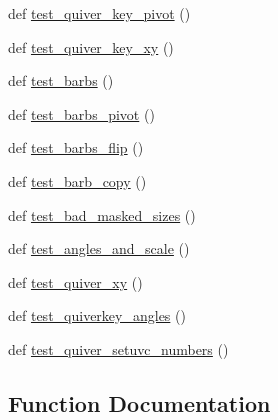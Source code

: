 \begin{DoxyCompactItemize}
\item 
def \hyperlink{namespacematplotlib_1_1tests_1_1test__quiver_a35cedc8f52b998cab732ffa707091ebb}{test\+\_\+quiver\+\_\+key\+\_\+pivot} ()
\item 
def \hyperlink{namespacematplotlib_1_1tests_1_1test__quiver_a6ef4a937ed2eefed3aab9983388fcafb}{test\+\_\+quiver\+\_\+key\+\_\+xy} ()
\item 
def \hyperlink{namespacematplotlib_1_1tests_1_1test__quiver_ac73571296fdfed6be8fbf589c1cf3985}{test\+\_\+barbs} ()
\item 
def \hyperlink{namespacematplotlib_1_1tests_1_1test__quiver_a16325962922cc6ab0040cfa9c488bc24}{test\+\_\+barbs\+\_\+pivot} ()
\item 
def \hyperlink{namespacematplotlib_1_1tests_1_1test__quiver_ae0d91521d7f5774c781232cc569a5295}{test\+\_\+barbs\+\_\+flip} ()
\item 
def \hyperlink{namespacematplotlib_1_1tests_1_1test__quiver_adec496174437aae624ec4a5483b289f9}{test\+\_\+barb\+\_\+copy} ()
\item 
def \hyperlink{namespacematplotlib_1_1tests_1_1test__quiver_a5ce173afaa72e137fe3be8271b66ae64}{test\+\_\+bad\+\_\+masked\+\_\+sizes} ()
\item 
def \hyperlink{namespacematplotlib_1_1tests_1_1test__quiver_a8fe03a9066aabaf3cd1b348ea7c862fa}{test\+\_\+angles\+\_\+and\+\_\+scale} ()
\item 
def \hyperlink{namespacematplotlib_1_1tests_1_1test__quiver_a0f506404da89165db04ceddac5c9171a}{test\+\_\+quiver\+\_\+xy} ()
\item 
def \hyperlink{namespacematplotlib_1_1tests_1_1test__quiver_a834fa9164de4c07e9d161dabef71dad1}{test\+\_\+quiverkey\+\_\+angles} ()
\item 
def \hyperlink{namespacematplotlib_1_1tests_1_1test__quiver_af47e4b9bc72f6c52919c79473f85bb4e}{test\+\_\+quiver\+\_\+setuvc\+\_\+numbers} ()
\end{DoxyCompactItemize}


\subsection{Function Documentation}
\mbox{\label{namespacematplotlib_1_1tests_1_1test__quiver_a81f72e82e400f747593892d86e070c31}} 
